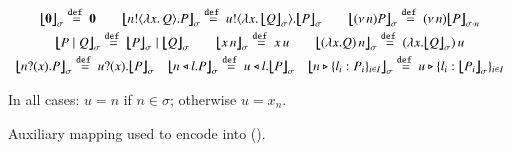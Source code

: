 \begin{figure}[t!]
\[%
	\begin{array}{c}
		\auxmapp{\inact}{{}}{\sigma}  \defeq  \inact
		\qquad \auxmapp{\bout{n}{\abs{x}{Q}} P}{{}}{\sigma} \defeq \bout{u}{\abs{x}{\auxmapp{Q}{{}}{\sigma}}} \auxmapp{P}{{}}{\sigma}
		\qquad
		\auxmapp{\news{n} P}{{}}{\sigma} \defeq \news{n} \auxmapp{P}{{}}{{\sigma \cat n}}
		\\[1mm]

		\auxmapp{P \Par Q}{{}}{\sigma} \defeq \auxmapp{P}{{}}{\sigma} \Par \auxmapp{Q}{{}}{\sigma} 
		\qquad
		\auxmapp{\appl{x}{n}}{{}}{\sigma} \defeq \appl{x}{u}
		\qquad
		\auxmapp{\appl{(\lambda x.Q)}{n}}{{}}{\sigma}  \defeq \appl{(\lambda x.\auxmapp{Q}{{}}{\sigma})}{u}
		\\[1mm]
		\auxmapp{\binp{n}{x} P}{{}}{\sigma} \defeq \binp{u}{x} \auxmapp{P}{{}}{\sigma} 
		\quad
		\auxmapp{\bsel{n}{l} P}{{}}{\sigma} \defeq \bsel{u}{l} \auxmapp{P}{{}}{\sigma} 
		\quad
		\auxmapp{\bbra{n}{l_i:P_i}_{i \in I}}{{}}{\sigma} \defeq \bbra{u}{l_i:\auxmapp{P_i}{{}}{\sigma}}_{i \in I}
	\end{array}
\]
\begin{center}
	{In all cases: $u = n$ if $n\in \sigma$; otherwise $u = x_n$.}
\end{center}
\caption{\label{f:auxmap} Auxiliary mapping used to encode \HOp into \HO ().}
\end{figure}

